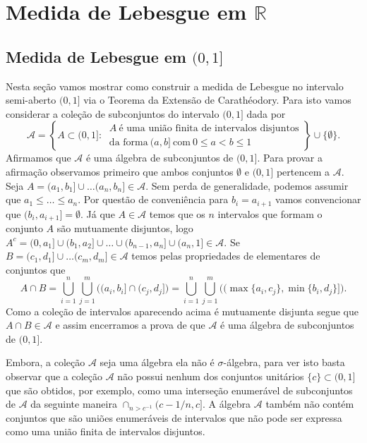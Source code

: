 \chapter[Aula 3]{Medida de Lebesgue em $\mathbb{R}$}
\chaptermark{}








\section{Medida de Lebesgue em $(0,1]$}


Nesta seção vamos mostrar como construir 
a medida de Lebesgue no 
intervalo semi-aberto $(0,1]$ via o Teorema 
da Extensão de Carathéodory. 
Para isto 
vamos considerar a coleção de 
subconjuntos do intervalo $(0,1]$ dada por 
\[
\mathcal{A}
=
\left\{ 
A\subset (0,1]:\ 
\begin{array}{c}
A\
\text{é uma união finita de intervalos disjuntos}
\\
\text{da forma}\ (a,b]
\ \text{com}\ 0\leq a<b\leq 1
\end{array}
\right\}
\cup
\{\emptyset\}.
\]
Afirmamos que $\mathcal{A}$ é uma álgebra de subconjuntos 
de $(0,1]$.
Para provar a afirmação observamos 
primeiro que ambos conjuntos $\emptyset$ e $(0,1]$ pertencem
a $\mathcal{A}$.  
Seja $A=(a_1,b_1]\cup\ldots (a_n,b_n]\in\mathcal{A}$. 
Sem perda de generalidade, podemos assumir que 
$a_1\leq \ldots \leq a_n$.
Por questão de conveniência 
para $b_i=a_{i+1}$
vamos convencionar que $(b_i,a_{i+1}]=\emptyset$. 
Já que $A\in\mathcal{A}$ 
temos que os $n$ intervalos que formam o conjunto 
$A$ são mutuamente disjuntos, logo
$
A^c=(0,a_1]\cup(b_1,a_2]
\cup\ldots\cup (b_{n-1},a_n]\cup (a_n,1] 
\in\mathcal{A}.
$
Se $B=(c_1,d_1]\cup\ldots (c_m,d_m]\in\mathcal{A}$
temos pelas propriedades de elementares de conjuntos
que 
\[
A\cap B
=
\bigcup_{i=1}^n \bigcup_{j=1}^{m}
\Big( (a_i,b_i]\cap (c_j,d_j] \Big)
=
\bigcup_{i=1}^n \bigcup_{j=1}^{m}
\Big( (\max\{a_i,c_j\},\min\{b_i,d_j\}] \Big).
\]
Como a coleção de intervalos aparecendo acima é
mutuamente disjunta segue que $A\cap B\in \mathcal{A}$
e assim encerramos a prova de que $\mathcal{A}$ 
é uma álgebra de subconjuntos de $(0,1]$.

Embora, a coleção $\mathcal{A}$ seja uma álgebra
ela não é $\sigma$-álgebra, para ver isto basta 
observar que a coleção $\mathcal{A}$ não possui 
nenhum dos conjuntos unitários $\{c\}\subset (0,1]$
que são obtidos, por exemplo, como uma interseção 
enumerável de subconjuntos de $\mathcal{A}$ da seguinte maneira
$\cap_{n>c^{-1}} (c-1/n,c]$.
A álgebra $\mathcal{A}$ também não contém conjuntos que 
são uniões enumeráveis de intervalos que não pode ser 
expressa como uma união finita de intervalos disjuntos.


